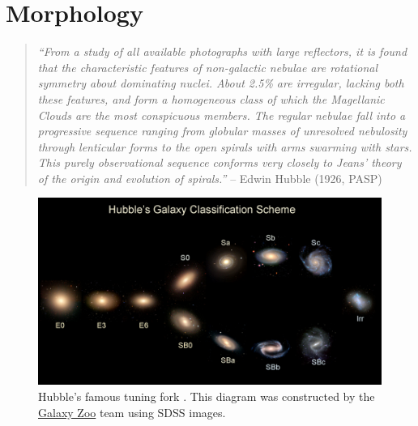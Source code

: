 \section{Morphology}

\begin{quote}
{\it ``From a study of all available photographs with large reflectors, it is found that the characteristic features of non-galactic 
nebulae are rotational symmetry about dominating nuclei. 
About 2.5\% are irregular, lacking both these features, and form a homogeneous class of which the Magellanic Clouds are the 
most conspicuous members. The regular nebulae fall into a progressive sequence ranging from globular masses of unresolved nebulosity through lenticular forms to the open spirals 
with arms swarming with stars. This purely observational 
sequence conforms very closely to Jeans' theory of the origin 
and evolution of spirals.''} -- Edwin Hubble (1926, PASP)
\end{quote}

\begin{figure}[t]
\centerline{%
\includegraphics[scale=2.1]{fig/HubbleTuningFork.jpg}}
\caption{Hubble's famous tuning fork \protect\citep{hubble26}. This diagram was constructed by the \href{http://www.galaxyzoo.org/}{Galaxy Zoo} team using SDSS images. \label{fig:tuningfork}}
\end{figure}

